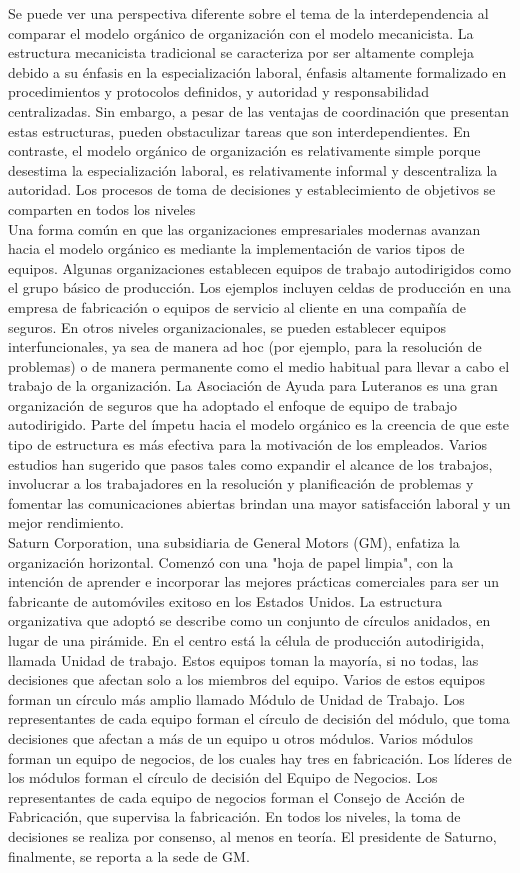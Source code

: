 \documentclass[10pt]{book}
\begin{document}
Se puede ver una perspectiva diferente sobre el tema de la interdependencia al comparar el modelo orgánico de organización con el modelo mecanicista. La estructura mecanicista tradicional se caracteriza por ser altamente compleja debido a su énfasis en la especialización laboral, énfasis altamente formalizado en procedimientos y protocolos definidos, y autoridad y responsabilidad centralizadas. Sin embargo, a pesar de las ventajas de coordinación que presentan estas estructuras, pueden obstaculizar tareas que son interdependientes. En contraste, el modelo orgánico de organización es relativamente simple porque desestima la especialización laboral, es relativamente informal y descentraliza la autoridad. Los procesos de toma de decisiones y establecimiento de objetivos se comparten en todos los niveles\\
Una forma común en que las organizaciones empresariales modernas avanzan hacia el modelo orgánico es mediante la implementación de varios tipos de equipos. Algunas organizaciones establecen equipos de trabajo autodirigidos como el grupo básico de producción. Los ejemplos incluyen celdas de producción en una empresa de fabricación o equipos de servicio al cliente en una compañía de seguros. En otros niveles organizacionales, se pueden establecer equipos interfuncionales, ya sea de manera ad hoc (por ejemplo, para la resolución de problemas) o de manera permanente como el medio habitual para llevar a cabo el trabajo de la organización. La Asociación de Ayuda para Luteranos es una gran organización de seguros que ha adoptado el enfoque de equipo de trabajo autodirigido. Parte del ímpetu hacia el modelo orgánico es la creencia de que este tipo de estructura es más efectiva para la motivación de los empleados. Varios estudios han sugerido que pasos tales como expandir el alcance de los trabajos, involucrar a los trabajadores en la resolución y planificación de problemas y fomentar las comunicaciones abiertas brindan una mayor satisfacción laboral y un mejor rendimiento.\\
Saturn Corporation, una subsidiaria de General Motors (GM), enfatiza la organización horizontal. Comenzó con una "hoja de papel limpia", con la intención de aprender e incorporar las mejores prácticas comerciales para ser un fabricante de automóviles exitoso en los Estados Unidos. La estructura organizativa que adoptó se describe como un conjunto de círculos anidados, en lugar de una pirámide. En el centro está la célula de producción autodirigida, llamada Unidad de trabajo. Estos equipos toman la mayoría, si no todas, las decisiones que afectan solo a los miembros del equipo. Varios de estos equipos forman un círculo más amplio llamado Módulo de Unidad de Trabajo. Los representantes de cada equipo forman el círculo de decisión del módulo, que toma decisiones que afectan a más de un equipo u otros módulos. Varios módulos forman un equipo de negocios, de los cuales hay tres en fabricación. Los líderes de los módulos forman el círculo de decisión del Equipo de Negocios. Los representantes de cada equipo de negocios forman el Consejo de Acción de Fabricación, que supervisa la fabricación. En todos los niveles, la toma de decisiones se realiza por consenso, al menos en teoría. El presidente de Saturno, finalmente, se reporta a la sede de GM.
\end{document}
